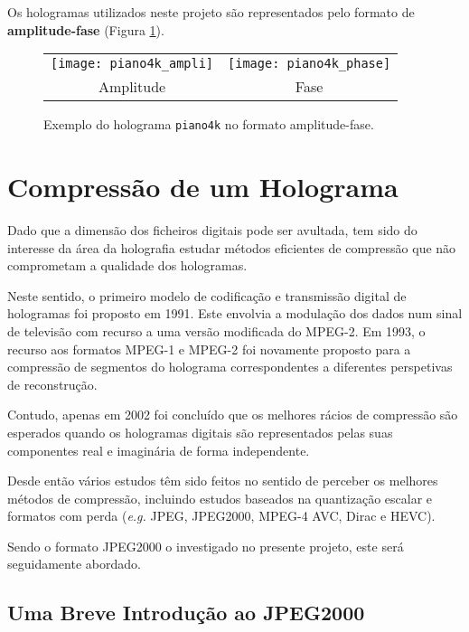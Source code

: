 Os hologramas utilizados neste projeto são representados pelo formato de \textbf{amplitude-fase} (Figura \ref{fig:ampli-fase}).


\begin{figure}[!htbp]
  \centering
  \begin{tabular}{c c}
    \texttt{[image: piano4k\_ampli]} &
    \texttt{[image: piano4k\_phase]} \\
     Amplitude & Fase \\
  \end{tabular}
  \caption[Exemplo de um holograma no formato amplitude-fase]{Exemplo do holograma \texttt{piano4k} no formato amplitude-fase.}
  \label{fig:ampli-fase}
\end{figure}


\section{Compressão de um Holograma}
\label{sec::estado-arte:compress}


Dado que a dimensão dos ficheiros digitais pode ser avultada, tem sido do interesse da área da holografia estudar métodos eficientes de compressão que não comprometam a qualidade dos hologramas.

Neste sentido, o primeiro modelo de codificação e transmissão digital de hologramas foi proposto em 1991. Este envolvia a modulação dos dados num sinal de televisão com recurso a uma versão modificada do MPEG-2\cite{Sato1991}. 
Em 1993, o recurso aos formatos MPEG-1 e MPEG-2 foi novamente proposto para a compressão de segmentos do holograma correspondentes a diferentes perspetivas de reconstrução\cite{YOSHIKAWA1993,Yoshikawa1996}.

Contudo, apenas em 2002 foi concluído que os melhores rácios de compressão são esperados quando os hologramas digitais são representados pelas suas componentes real e imaginária de forma independente\cite{Naughton2002}.

Desde então vários estudos têm sido feitos no sentido de perceber os melhores métodos de compressão, incluindo estudos baseados na quantização escalar\cite{Arrifano}
e formatos com perda (\textit{e.g.} JPEG, JPEG2000, MPEG-4 AVC, Dirac e HEVC)\cite{Xing2014,Darakis2010,Peixeiro2016,Pinheiro2018}.

Sendo o formato JPEG2000 o investigado no presente projeto, este será seguidamente abordado.


\subsection{Uma Breve Introdução ao JPEG2000}
\label{ssec::estado-arte:compress:jpeg2000}

